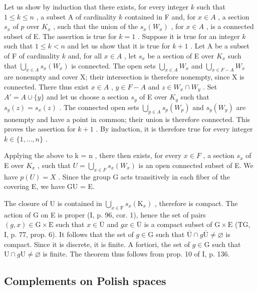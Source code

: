 Let us show by induction that there exists, for every integer \(k\) such that \(1 \leqslant k \leqslant n\) , a subset A of cardinality \(k\) contained in F and, for \(x \in A\) , a section \(s_x\) of \(p\) over \(K_x\) , such that the union of the \(s_x(W_x)\) , for \(x \in A\) , is a connected subset of E. The assertion is true for \(k = 1\) . Suppose it is true for an integer \(k\) such that \(1 \leqslant k < n\) and let us show that it is true for \(k + 1\) . Let A be a subset of F of cardinality \(k\) and, for all \(x \in A\) , let \(s_x\) be a section of E over \(K_x\) such that \(\bigcup_{x \in A} s_x(W_x)\) is connected. The open sets \(\bigcup_{x \in A} W_x\) and \(\bigcup_{x \in F-A} W_x\) are nonempty and cover X; their intersection is therefore nonempty, since X is connected. There thus exist \(x \in A\) , \(y \in F - A\) and \(z \in W_x \cap W_y\) . Set \(A' = A \cup \{y\}\) and let us choose a section \(s_y\) of E over \(K_y\) such that \(s_y(z) = s_x(z)\) . The connected open sets \(\bigcup_{p \in A} s_p(W_p)\) and \(s_y(W_y)\) are nonempty and have a point in common; their union is therefore connected. This proves the assertion for \(k + 1\) . By induction, it is therefore true for every integer \(k \in \{1, \ldots, n\}\) .

Applying the above to k = n , there then exists, for every \(x \in F\) , a section \(s_x\) of E over \(K_x\) , such that \(U = \bigcup_{x \in F} s_x(W_x)\) is an open connected subset of E. We have \(p(U) = X\) . Since the group G acts transitively in each fiber of the covering E, we have GU = E.

The closure of U is contained in \(\bigcup_{x\in\mathrm{F}}s_x(\mathrm{K}_x)\) , therefore is compact. The action of G on E is proper (I, p. 96, cor. 1), hence the set of pairs \((g,x)\in\mathrm{G}\times\mathrm{E}\) such that \(x\in\overline{\mathrm{U}}\) and \(gx\in\overline{\mathrm{U}}\) is a compact subset of \(\mathrm{G}\times\mathrm{E}\) (TG, I, p. 77, prop. 6). It follows that the set of \(g\in\mathrm{G}\) such that \(\overline{\mathrm{U}}\cap g\overline{\mathrm{U}}\neq\varnothing\) is compact. Since it is discrete, it is finite. A fortiori, the set of \(g\in\mathrm{G}\) such that \(\mathrm{U}\cap g\mathrm{U}\neq\varnothing\) is finite. The theorem thus follows from prop. 10 of I, p. 136.

\subsection{Complements on Polish spaces}

